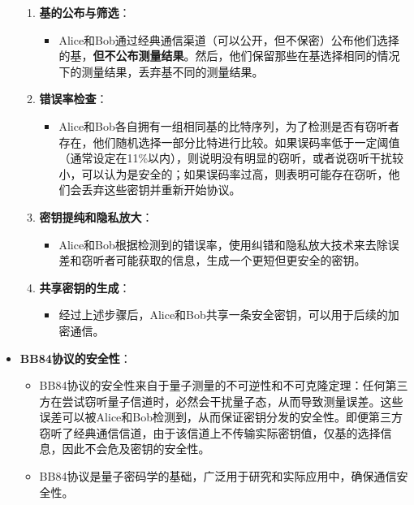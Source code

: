 \documentclass[dvipsnames, svgnames,a4paper,11pt]{article}
\begin{document}
\begin{itemize}
\begin{enumerate}
			\item \textbf{基的公布与筛选}：
			\begin{itemize}
				\item Alice和Bob通过经典通信渠道（可以公开，但不保密）公布他们选择的基，\textbf{但不公布测量结果}。然后，他们保留那些在基选择相同的情况下的测量结果，丢弃基不同的测量结果。
			\end{itemize}

			\item \textbf{错误率检查}：
			\begin{itemize}
				\item Alice和Bob各自拥有一组相同基的比特序列，为了检测是否有窃听者存在，他们随机选择一部分比特进行比较。如果误码率低于一定阈值（通常设定在11\%以内），则说明没有明显的窃听，或者说窃听干扰较小，可以认为是安全的；如果误码率过高，则表明可能存在窃听，他们会丢弃这些密钥并重新开始协议。
			\end{itemize}

			\item \textbf{密钥提纯和隐私放大}：
			\begin{itemize}
				\item Alice和Bob根据检测到的错误率，使用纠错和隐私放大技术来去除误差和窃听者可能获取的信息，生成一个更短但更安全的密钥。
			\end{itemize}

			\item \textbf{共享密钥的生成}：
			\begin{itemize}
				\item 经过上述步骤后，Alice和Bob共享一条安全密钥，可以用于后续的加密通信。
			\end{itemize}
		\end{enumerate}

		\item \textbf{BB84协议的安全性}：
		\begin{itemize}
			\item BB84协议的安全性来自于量子测量的不可逆性和不可克隆定理：任何第三方在尝试窃听量子信道时，必然会干扰量子态，从而导致测量误差。这些误差可以被Alice和Bob检测到，从而保证密钥分发的安全性。即便第三方窃听了经典通信信道，由于该信道上不传输实际密钥值，仅基的选择信息，因此不会危及密钥的安全性。
			\item BB84协议是量子密码学的基础，广泛用于研究和实际应用中，确保通信安全性。
		\end{itemize}
	\end{itemize}
\end{document}
